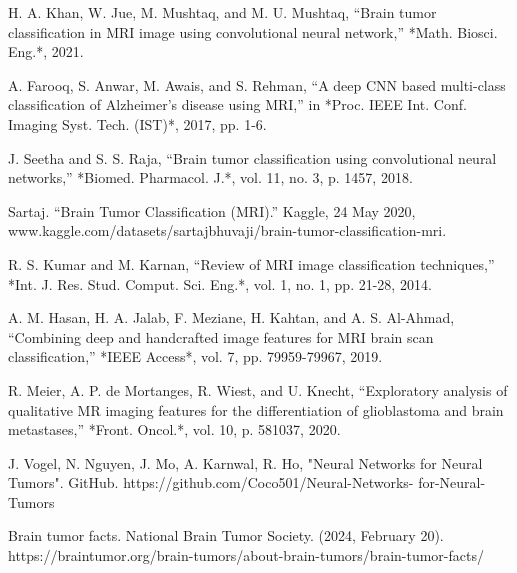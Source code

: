 \documentclass[conference]{IEEEtran}
\begin{document}
\begin{thebibliography}{00}

H. A. Khan, W. Jue, M. Mushtaq, and M. U. Mushtaq, “Brain tumor classification in MRI image using convolutional neural network,” *Math. Biosci. Eng.*, 2021. 

A. Farooq, S. Anwar, M. Awais, and S. Rehman, “A deep CNN based multi-class classification of Alzheimer's disease using MRI,” in *Proc. IEEE Int. Conf. Imaging Syst. Tech. (IST)*, 2017, pp. 1-6. 

J. Seetha and S. S. Raja, “Brain tumor classification using convolutional neural networks,” *Biomed. Pharmacol. J.*, vol. 11, no. 3, p. 1457, 2018.

Sartaj. “Brain Tumor Classification (MRI).” Kaggle, 24 May 2020, www.kaggle.com/datasets/sartajbhuvaji/brain-tumor-classification-mri. 

R. S. Kumar and M. Karnan, “Review of MRI image classification techniques,” *Int. J. Res. Stud. Comput. Sci. Eng.*, vol. 1, no. 1, pp. 21-28, 2014. 

A. M. Hasan, H. A. Jalab, F. Meziane, H. Kahtan, and A. S. Al-Ahmad, “Combining deep and handcrafted image features for MRI brain scan classification,” *IEEE Access*, vol. 7, pp. 79959-79967, 2019. 

R. Meier, A. P. de Mortanges, R. Wiest, and U. Knecht, “Exploratory analysis of qualitative MR imaging features for the differentiation of glioblastoma and brain metastases,” *Front. Oncol.*, vol. 10, p. 581037, 2020.

J. Vogel, N. Nguyen, J. Mo, A. Karnwal, R. Ho, "Neural Networks for Neural Tumors". GitHub. https://github.com/Coco501/Neural-Networks-
for-Neural-Tumors

Brain tumor facts. National Brain Tumor Society. (2024, February 20). https://braintumor.org/brain-tumors/about-brain-tumors/brain-tumor-facts/ 

\end{thebibliography}
\end{document}
